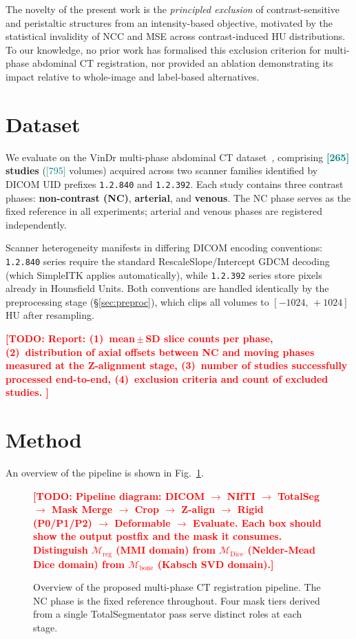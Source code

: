 \documentclass[10pt,twocolumn]{article}
\newcommand{\TODO}[1]{\textcolor{red}{\textbf{[TODO: #1]}}}
\newcommand{\NUM}[1]{\textcolor{teal}{[#1]}}
\newcommand{\Mreg}{\mathcal{M}_{\text{reg}}}
\newcommand{\Mbone}{\mathcal{M}_{\text{bone}}}
\newcommand{\Mdice}{\mathcal{M}_{\text{Dice}}}
\begin{document}
The novelty of the present work is the \emph{principled exclusion}
of contrast-sensitive and peristaltic structures from an
intensity-based objective, motivated by the statistical invalidity
of NCC and MSE across contrast-induced HU distributions.
To our knowledge, no prior work has formalised this exclusion criterion
for multi-phase abdominal CT registration, nor provided an ablation
demonstrating its impact relative to whole-image and label-based
alternatives.

\section{Dataset}
\label{sec:dataset}

We evaluate on the VinDr multi-phase abdominal CT dataset~\cite{vindr},
comprising \textbf{\NUM{265} studies} (\NUM{795} volumes) acquired across
two scanner families identified by DICOM UID prefixes
\texttt{1.2.840} and \texttt{1.2.392}.
Each study contains three contrast phases: \textbf{non-contrast (NC)},
\textbf{arterial}, and \textbf{venous}.
The NC phase serves as the fixed reference in all experiments; arterial
and venous phases are registered independently.

Scanner heterogeneity manifests in differing DICOM encoding conventions:
\texttt{1.2.840} series require the standard RescaleSlope/Intercept
GDCM decoding (which SimpleITK applies automatically), while
\texttt{1.2.392} series store pixels already in Hounsfield Units.
Both conventions are handled identically by the preprocessing stage
(\S\ref{sec:preproc}), which clips all volumes to
$[-1024,\,+1024]$\,HU after resampling.

\TODO{%
  Report: (1)~mean\,$\pm$\,SD slice counts per phase,
  (2)~distribution of axial offsets between NC and moving phases
  measured at the Z-alignment stage,
  (3)~number of studies successfully processed end-to-end,
  (4)~exclusion criteria and count of excluded studies.
}

\section{Method}
\label{sec:method}

An overview of the pipeline is shown in Fig.~\ref{fig:pipeline}.

\begin{figure}[t]
  \centering
  \TODO{Pipeline diagram: DICOM $\to$ NIfTI $\to$ TotalSeg $\to$
  Mask Merge $\to$ Crop $\to$ Z-align $\to$ Rigid (P0/P1/P2)
  $\to$ Deformable $\to$ Evaluate.
  Each box should show the output postfix and the mask it consumes.
  Distinguish $\Mreg$ (MMI domain) from $\Mdice$ (Nelder-Mead Dice
  domain) from $\Mbone$ (Kabsch SVD domain).}
  \caption{Overview of the proposed multi-phase CT registration pipeline.
  The NC phase is the fixed reference throughout. Four mask tiers derived
  from a single TotalSegmentator pass serve distinct roles at each stage.}
  \label{fig:pipeline}
\end{figure}
\end{document}
